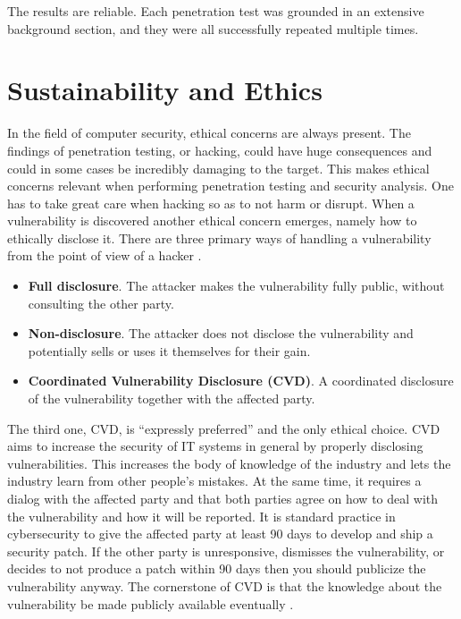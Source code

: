 The results are reliable. Each penetration test was grounded in an extensive background section, and they were all successfully repeated multiple times.

\section{Sustainability and Ethics}
In the field of computer security, ethical concerns are always present. The findings of penetration testing, or hacking, could have huge consequences and could in some cases be incredibly damaging to the target. This makes ethical concerns relevant when performing penetration testing and security analysis. One has to take great care when hacking so as to not harm or disrupt. When a vulnerability is discovered another ethical concern emerges, namely how to ethically disclose it. There are three primary ways of handling a vulnerability from the point of view of a hacker \cite{disclosure-guideline}.
\begin{itemize}
    \item \textbf{Full disclosure}. The attacker makes the vulnerability fully public, without consulting the other party.
    \item \textbf{Non-disclosure}. The attacker does not disclose the vulnerability and potentially sells or uses it themselves for their gain.
    \item \textbf{Coordinated Vulnerability Disclosure (CVD)}. A coordinated disclosure of the vulnerability together with the affected party.
\end{itemize}
The third one, CVD, is \enquote{expressly preferred} \cite{disclosure-guideline} and the only ethical choice. CVD aims to increase the security of IT systems in general by properly disclosing vulnerabilities. This increases the body of knowledge of the industry and lets the industry learn from other people's mistakes. At the same time, it requires a dialog with the affected party and that both parties agree on how to deal with the vulnerability and how it will be reported. It is standard practice in cybersecurity to give the affected party at least 90 days to develop and ship a security patch. If the other party is unresponsive, dismisses the vulnerability, or decides to not produce a patch within 90 days then you should publicize the vulnerability anyway. The cornerstone of CVD is that the knowledge about the vulnerability be made publicly available eventually \cite{disclosure-guideline}.

